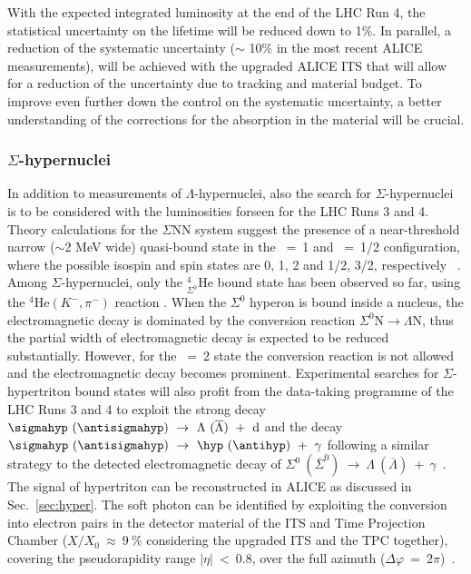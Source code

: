 With the expected integrated \PbPb luminosity at the end of the LHC Run 4, the statistical uncertainty on the lifetime will be reduced down to 1$\%$. 
In parallel, a reduction of the systematic uncertainty ($\sim$ 10$\%$ in the most recent ALICE measurements), will be achieved with the upgraded ALICE ITS that will allow for a reduction of the uncertainty due to tracking and material budget. 
To improve even further down the control on the systematic uncertainty, a better understanding of the corrections for the absorption in the material will be crucial. 

\subsubsection{$\Sigma$-hypernuclei}
In addition to measurements of $\Lambda$-hypernuclei, also the search for $\Sigma$-hypernuclei is to be considered with the luminosities forseen for the LHC Runs 3 and 4. 
Theory calculations for the $\Sigma$NN system suggest the presence of a near-threshold narrow ($\sim$2 MeV wide) quasi-bound state in the \isospin~=~1 and \spinJ~=~1/2 configuration, where the possible isospin and spin states are 0, 1, 2 and 1/2, 3/2, respectively ~\cite{cite:SigmaTriton-theory}. 
Among $\Sigma$-hypernuclei, only the $_{\Sigma^0}^{4}\mathrm{He}$ bound state has been observed so far, using the ${^4}\mathrm{He}(K^-,\pi^-)$ reaction \cite{cite:SigmaTriton-data}.
When the $\Sigma^0$ hyperon is bound inside a nucleus, the electromagnetic decay is dominated by the conversion reaction $\Sigma^{0}\mathrm{N}\to\Lambda\mathrm{N}$, thus the partial width of electromagnetic decay is expected to be reduced substantially. 
However, for the \isospin~=~2 state the conversion reaction is not allowed and the electromagnetic decay becomes prominent.
%
Experimental searches for  $\Sigma$-hypertriton bound states will also profit from the \PbPb data-taking programme of the LHC Runs 3 and 4 to exploit the strong decay
$\sigmahyp~(\antisigmahyp)~\rightarrow~\Lambda~(\overline{\Lambda})~+~\mathrm{d}$
and the decay $\sigmahyp~(\antisigmahyp)~\rightarrow~\hyp~(\antihyp)~+~\gamma$
following a similar strategy to the detected electromagnetic decay of 
$\Sigma^{0}~(\overline{\Sigma}^{0})~\rightarrow~\Lambda~(\overline{\Lambda})~+~\gamma$~\cite{Borissov:2015ura}.
The signal of hypertriton can be reconstructed in ALICE as discussed in Sec.~\ref{sec:hyper}. The soft photon can be identified by exploiting the conversion into electron pairs in the detector material of the ITS and Time Projection Chamber ($X/X_0~\approx~9~\%$ considering the upgraded ITS and the TPC together), covering the pseudorapidity range $\vert\eta\vert~<~0.8$, over the full azimuth ($\Delta\varphi~=~2\pi$)~\cite{Abelev:2014ffa}.
